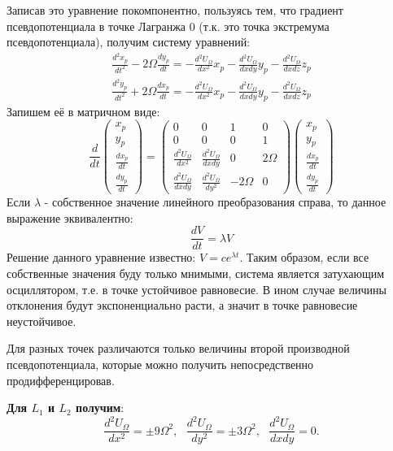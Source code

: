 \documentclass[a4paper]{article} %
\begin{document}
Записав это уравнение покомпонентно, пользуясь тем, что градиент псевдопотенциала в точке Лагранжа 0 (т.к. это точка экстремума псевдопотенциала), получим систему уравнений:
\begin{equation}
\begin{split}
\frac{d^2x_p}{dt^2} - 2\Omega\frac{dy_p}{dt} = -\frac{d^2U_\Omega}{dx^2}x_p - \frac{d^2U_\Omega}{dxdy}y_p - \frac{d^2U_\Omega}{dxdz}z_p \\
\frac{d^2y_p}{dt^2} + 2\Omega\frac{dx_p}{dt} = -\frac{d	^2U_\Omega}{dx^2}x_p - \frac{d^2U_\Omega}{dxdy}y_p - \frac{d^2U_\Omega}{dxdz}z_p
\end{split}
\end{equation}
Запишем её в матричном виде:
\begin{equation}
\frac{d}{dt}
\begin{pmatrix}
x_p \\
y_p \\
\frac{dx_p}{dt}\\
\frac{dy_p}{dt}
\end{pmatrix}
=
\begin{pmatrix}
0 & 0 & 1 & 0 \\
0 & 0 & 0 & 1 \\
\frac{d^2U_\Omega}{dx^2} & \frac{d^2U_\Omega}{dxdy} & 0 & 2\Omega \\
\frac{d^2U_\Omega}{dxdy} & \frac{d^2U_\Omega}{dy^2} & -2\Omega & 0
\end{pmatrix}
\begin{pmatrix}
x_p \\
y_p \\
\frac{dx_p}{dt}\\
\frac{dy_p}{dt}
\end{pmatrix}
\end{equation}
Если $\lambda$ - собственное значение линейного преобразования справа, то данное выражение эквивалентно:
\begin{equation}
\frac{dV}{dt} = \lambda V
\end{equation}
Решение данного уравнение известно: $V = ce^{\lambda t}$. Таким образом, если все собственные значения буду только мнимыми, система является затухающим осциллятором, т.е. в точке устойчивое равновесие. В ином случае величины отклонения будут экспоненциально расти, а значит в точке равновесие неустойчивое.

Для разных точек различаются только величины второй производной псевдопотенциала, которые можно получить непосредственно продифференцировав.

\textbf{Для $L_1$ и $L_2$ получим}:
\begin{equation}
\frac{d^2U_\Omega}{dx^2} = \pm 9\Omega^2, \text{ }\frac{d^2U_\Omega}{dy^2} = \pm 3\Omega^2, \text{ }\frac{d^2U_\Omega}{dxdy} = 0.
\end{equation}
\end{document}
